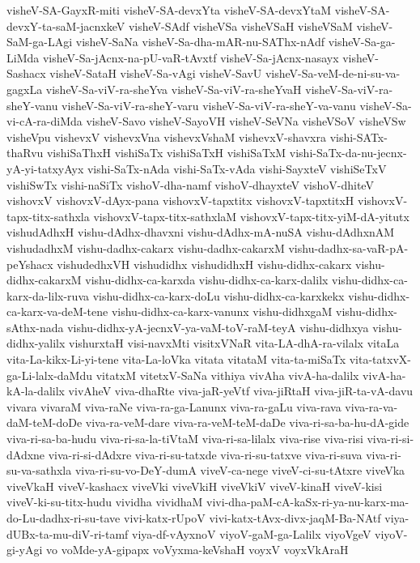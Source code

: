 {visheV-SA-GayxR-miti
visheV-SA-devxYta
visheV-SA-devxYtaM
visheV-SA-devxY-ta-saM-jacnxkeV
visheV-SAdf
visheVSa
visheVSaH
visheVSaM
visheV-SaM-ga-LAgi
visheV-SaNa
visheV-Sa-dha-mAR-nu-SAThx-nAdf
visheV-Sa-ga-LiMda
visheV-Sa-jAcnx-na-pU-vaR-tAvxtf
visheV-Sa-jAcnx-nasayx
visheV-Sashacx
visheV-SataH
visheV-Sa-vAgi
visheV-SavU
visheV-Sa-veM-de-ni-su-va-gagxLa
visheV-Sa-viV-ra-sheYva
visheV-Sa-viV-ra-sheYvaH
visheV-Sa-viV-ra-sheY-vanu
visheV-Sa-viV-ra-sheY-varu
visheV-Sa-viV-ra-sheY-va-vanu
visheV-Sa-vi-cA-ra-diMda
visheV-Savo
visheV-SayoVH
visheV-SeVNa
visheVSoV
visheVSw
visheVpu
vishevxV
vishevxVna
vishevxVshaM
vishevxV-shavxra
vishi-SATx-thaRvu
vishiSaThxH
vishiSaTx
vishiSaTxH
vishiSaTxM
vishi-SaTx-da-nu-jecnx-yA-yi-tatxyAyx
vishi-SaTx-nAda
vishi-SaTx-vAda
vishi-SayxteV
vishiSeTxV
vishiSwTx
vishi-naSiTx
vishoV-dha-namf
vishoV-dhayxteV
vishoV-dhiteV
vishovxV
vishovxV-dAyx-pana
vishovxV-tapxtitx
vishovxV-tapxtitxH
vishovxV-tapx-titx-sathxla
vishovxV-tapx-titx-sathxlaM
vishovxV-tapx-titx-yiM-dA-yitutx
vishudAdhxH
vishu-dAdhx-dhavxni
vishu-dAdhx-mA-nuSA
vishu-dAdhxnAM
vishudadhxM
vishu-dadhx-cakarx
vishu-dadhx-cakarxM
vishu-dadhx-sa-vaR-pA-peYshacx
vishudedhxVH
vishudidhx
vishudidhxH
vishu-didhx-cakarx
vishu-didhx-cakarxM
vishu-didhx-ca-karxda
vishu-didhx-ca-karx-dalilx
vishu-didhx-ca-karx-da-lilx-ruva
vishu-didhx-ca-karx-doLu
vishu-didhx-ca-karxkekx
vishu-didhx-ca-karx-va-deM-tene
vishu-didhx-ca-karx-vanunx
vishu-didhxgaM
vishu-didhx-sAthx-nada
vishu-didhx-yA-jecnxV-ya-vaM-toV-raM-teyA
vishu-didhxya
vishu-didhx-yalilx
vishurxtaH
visi-navxMti
visitxVNaR
vita-LA-dhA-ra-vilalx
vitaLa
vita-La-kikx-Li-yi-tene
vita-La-loVka
vitata
vitataM
vita-ta-miSaTx
vita-tatxvX-ga-Li-lalx-daMdu
vitatxM
vitetxV-SaNa
vithiya
vivAha
vivA-ha-dalilx
vivA-ha-kA-la-dalilx
vivAheV
viva-dhaRte
viva-jaR-yeVtf
viva-jiRtaH
viva-jiR-ta-vA-davu
vivara
vivaraM
viva-raNe
viva-ra-ga-Lanunx
viva-ra-gaLu
viva-rava
viva-ra-va-daM-teM-doDe
viva-ra-veM-dare
viva-ra-veM-teM-daDe
viva-ri-sa-ba-hu-dA-gide
viva-ri-sa-ba-hudu
viva-ri-sa-la-tiVtaM
viva-ri-sa-lilalx
viva-rise
viva-risi
viva-ri-si-dAdxne
viva-ri-si-dAdxre
viva-ri-su-tatxde
viva-ri-su-tatxve
viva-ri-suva
viva-ri-su-va-sathxla
viva-ri-su-vo-DeY-dumA
viveV-ca-nege
viveV-ci-su-tAtxre
viveVka
viveVkaH
viveV-kashacx
viveVki
viveVkiH
viveVkiV
viveV-kinaH
viveV-kisi
viveV-ki-su-titx-hudu
vividha
vividhaM
vivi-dha-paM-cA-kaSx-ri-ya-nu-karx-ma-do-Lu-dadhx-ri-su-tave
vivi-katx-rUpoV
vivi-katx-tAvx-divx-jaqM-Ba-NAtf
viya-dUBx-ta-mu-diV-ri-tamf
viya-df-vAyxnoV
viyoV-gaM-ga-Lalilx
viyoVgeV
viyoV-gi-yAgi
vo
voMde-yA-gipapx
voVyxma-keVshaH
voyxV
voyxVkAraH
}
